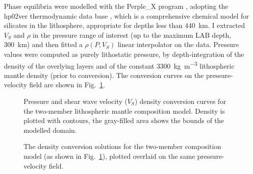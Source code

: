 Phase equilibria were modelled with the {Perple\_X} program \parencites{Connolly2005}{Connolly2009}, adopting the {hp02ver} thermodynamic data base \parencites{Powell1998_hp02}{Ghiorso2002_pMELTS}, which is a comprehensive chemical model for silicates in the lithosphere, appropriate for depths less than \SI{440}{\kilo \metre}.
I extracted $V_S$ and $\rho$ in the pressure range of interest (up to the maximum LAB depth, \SI{300}{\kilo \metre}) and then fitted a $\rho (P, V_S)$ linear interpolator on the data.
Pressure values were computed as purely lithostatic pressure, by depth-integration of the density of the overlying layers and of the constant \SI{3300}{\kilo \gram \per \cubic \metre} lithospheric mantle density (prior to conversion).
The conversion curves on the pressure-velocity field are shown in Fig.~\ref{fig:SigIs:VelConvCurves}.

\begin{figure}
    \begin{adjustbox}{center}
    \end{adjustbox}
    \caption[Pressure and shear wave velocity density conversion.]{Pressure and shear wave velocity ($V_S$) density conversion curves for the two-member lithospheric mantle composition model. Density is plotted with contours, the gray-filled area shows the bounds of the modelled domain.
    }
    \label{fig:SigIs:VelConvCurves}
\end{figure}

\begin{figure}
    \begin{adjustbox}{center}
    \end{adjustbox}
    \caption[Density conversion curves: direct comparison between the two members.]{
        The density conversion solutions for the two-member composition model (as shown in Fig.~\ref{fig:SigIs:VelConvCurves}), plotted overlaid on the same pressure-velocity field.
    }
    \label{fig:SigIs:VelConvCurves_comp}
\end{figure}

